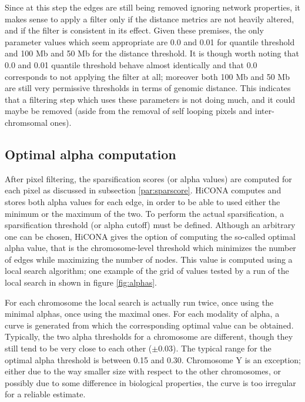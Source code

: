 Since at this step the edges are still being removed ignoring network properties, it makes sense to apply a filter only if the distance metrics are not heavily altered, and if the filter is consistent in its effect. Given these premises, the only parameter values which seem appropriate are 0.0 and 0.01 for quantile threshold and 100 Mb and 50 Mb for the distance threshold. It is though worth noting that 0.0 and 0.01 quantile threshold behave almost identically and that 0.0 corresponds to not applying the filter at all; moreover both 100 Mb and 50 Mb are still very permissive thresholds in terms of genomic distance. This indicates that a filtering step which uses these parameters is not doing much, and it could maybe be removed (aside from the removal of self looping pixels and inter-chromsomal ones).

\newpage
\subsection{Optimal alpha computation}

After pixel filtering, the sparsification scores (or alpha values) are computed for each pixel as discussed in subsection \ref{par:sparscore}. HiCONA computes and stores both alpha values for each edge, in order to be able to used either the minimum or the maximum of the two. To perform the actual sparsification, a sparsification threshold (or alpha cutoff) must be defined. Although an arbitrary one can be chosen, HiCONA gives the option of computing the so-called optimal alpha value, that is the chromosome-level threshold which minimizes the number of edges while maximizing the number of nodes. This value is computed using a local search algorithm; one example of the grid of values tested by a run of the local search in shown in figure \ref{fig:alphas}.

For each chromosome the local search is actually run twice, once using the minimal alphas, once using the maximal ones. For each modality of alpha, a curve is generated from which the corresponding optimal value can be obtained. Typically, the two alpha thresholds for a chromosome are different, though they still tend to be very close to each other ($\pm 0.03$). The typical range for the optimal alpha threshold is between 0.15 and 0.30. Chromosome Y is an exception; either due to the way smaller size with respect to the other chromosomes, or possibly due to some difference in biological properties, the curve is too irregular for a reliable estimate. 

